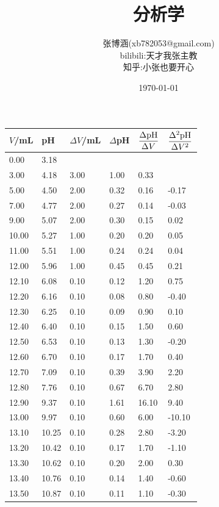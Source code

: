 \documentclass[UTF8,AutoFakeBold]{ctexbook}
\title{\kaishu\textbf {分析学}}
\author{\kaishu 张博涵(xb782053@gmail.com)\\
\kaishu bilibili:天才我张主教\\
\kaishu 知乎:小张也要开心}
\date{\kaishu \today}
\begin{document}
\begin{table}
    \centering
     \begin{tabular}{p{2cm}<{\centering} p{2cm}<{\centering} p{2cm}<{\centering} p{2cm}<{\centering} p{2cm}<{\centering} p{2cm}<{\centering}}
		\toprule
        $V$/mL & pH & $\Delta V$/mL & $\Delta$pH & $\dfrac{\Delta \ce{pH}}{\Delta V}$ & $\dfrac{\Delta^{2} \ce{pH}}{\Delta V^{2}}$ \\
        \midrule
        0.00 & 3.18 &  &  &  &  \\ 
        3.00 & 4.18 & 3.00 & 1.00 & 0.33 &  \\ 
        5.00 & 4.50 & 2.00 & 0.32 & 0.16 & -0.17  \\ 
        7.00 & 4.77 & 2.00 & 0.27 & 0.14 & -0.03  \\ 
        9.00 & 5.07 & 2.00 & 0.30 & 0.15 & 0.02  \\ 
        10.00 & 5.27 & 1.00 & 0.20 & 0.20 & 0.05  \\ 
        11.00 & 5.51 & 1.00 & 0.24 & 0.24 & 0.04  \\ 
        12.00 & 5.96 & 1.00 & 0.45 & 0.45 & 0.21  \\ 
        12.10 & 6.08 & 0.10 & 0.12 & 1.20 & 0.75  \\ 
        12.20 & 6.16 & 0.10 & 0.08 & 0.80 & -0.40  \\ 
        12.30 & 6.25 & 0.10 & 0.09 & 0.90 & 0.10  \\ 
        12.40 & 6.40 & 0.10 & 0.15 & 1.50 & 0.60  \\ 
        12.50 & 6.53 & 0.10 & 0.13 & 1.30 & -0.20  \\ 
        12.60 & 6.70 & 0.10 & 0.17 & 1.70 & 0.40  \\ 
        12.70 & 7.09 & 0.10 & 0.39 & 3.90 & 2.20  \\ 
        12.80 & 7.76 & 0.10 & 0.67 & 6.70 & 2.80  \\ 
        12.90 & 9.37 & 0.10 & 1.61 & 16.10 & 9.40  \\ 
        13.00 & 9.97 & 0.10 & 0.60 & 6.00 & -10.10  \\ 
        13.10 & 10.25 & 0.10 & 0.28 & 2.80 & -3.20  \\ 
        13.20 & 10.42 & 0.10 & 0.17 & 1.70 & -1.10  \\ 
        13.30 & 10.62 & 0.10 & 0.20 & 2.00 & 0.30  \\ 
        13.40 & 10.76 & 0.10 & 0.14 & 1.40 & -0.60  \\ 
        13.50 & 10.87 & 0.10 & 0.11 & 1.10 & -0.30  \\ 

\end{tabular}
\end{table}
\end{document}
